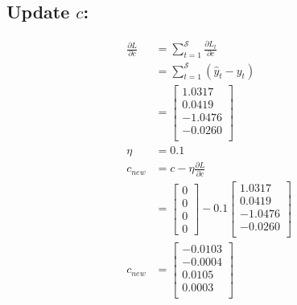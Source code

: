 \documentclass{article}
\begin{document}
\subsection{Update $c$:}
\begin{align*}
\frac{\partial L}{\partial c} &= \sum_{t=1}^{\mathcal{S}} \frac{\partial L_t}{\partial c} \\
 &=\sum_{t=1}^{\mathcal{S}} (\hat{y}_{t} - y_{t})\\
 &=\begin{bmatrix}
1.0317 \\
0.0419 \\
-1.0476 \\
-0.0260 \\
\end{bmatrix} \\
\eta &= 0.1\\
c_{new} &= c - \eta \frac{\partial L}{\partial c}\\
 &= \begin{bmatrix}
    0 \\
    0 \\
    0 \\
    0
\end{bmatrix} - 0.1 \begin{bmatrix}
1.0317 \\
0.0419 \\
-1.0476 \\
-0.0260 \\
\end{bmatrix} \\
c_{new} &= \begin{bmatrix}
-0.0103 \\
-0.0004 \\
0.0105 \\
0.0003 \\
\end{bmatrix}
\end{align*}
\end{document}
